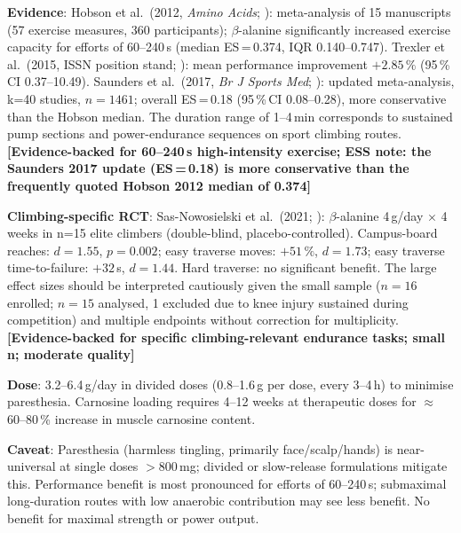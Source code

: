 \textbf{Evidence}: Hobson et al.\ (2012, \textit{Amino Acids}; \cite{HSB+12}): meta-analysis of 15 manuscripts (57 exercise measures, 360 participants); $\beta$-alanine significantly increased exercise capacity for efforts of 60--240\,s (median ES\,=\,0.374, IQR 0.140--0.747). Trexler et al.\ (2015, ISSN position stand; \cite{TSRS+15}): mean performance improvement $+2.85\,\%$ (95\,\%\,CI 0.37--10.49). Saunders et al.\ (2017, \textit{Br J Sports Med}; \cite{SESA+16}): updated meta-analysis, k=40 studies, $n{=}1461$; overall ES\,=\,0.18 (95\,\%\,CI 0.08--0.28), more conservative than the Hobson median. The duration range of 1--4\,min corresponds to sustained pump sections and power-endurance sequences on sport climbing routes. \textbf{[Evidence-backed for 60--240\,s high-intensity exercise; ESS note: the Saunders 2017 update (ES\,=\,0.18) is more conservative than the frequently quoted Hobson 2012 median of 0.374]}

\textbf{Climbing-specific RCT}: Sas-Nowosielski et al.\ (2021; \cite{SNWK21}): $\beta$-alanine 4\,g/day $\times$ 4 weeks in n=15 elite climbers (double-blind, placebo-controlled). Campus-board reaches: $d{=}1.55$, $p{=}0.002$; easy traverse moves: $+51\,\%$, $d{=}1.73$; easy traverse time-to-failure: $+32$\,s, $d{=}1.44$. Hard traverse: no significant benefit. The large effect sizes should be interpreted cautiously given the small sample ($n{=}16$ enrolled; $n{=}15$ analysed, 1 excluded due to knee injury sustained during competition) and multiple endpoints without correction for multiplicity. \textbf{[Evidence-backed for specific climbing-relevant endurance tasks; small n; moderate quality]}

\textbf{Dose}: 3.2--6.4\,g/day in divided doses (0.8--1.6\,g per dose, every 3--4\,h) to minimise paresthesia. Carnosine loading requires 4--12 weeks at therapeutic doses for ${\approx}$60--80\,\% increase in muscle carnosine content.

\textbf{Caveat}: Paresthesia (harmless tingling, primarily face/scalp/hands) is near-universal at single doses $>$800\,mg; divided or slow-release formulations mitigate this. Performance benefit is most pronounced for efforts of 60--240\,s; submaximal long-duration routes with low anaerobic contribution may see less benefit. No benefit for maximal strength or power output.

